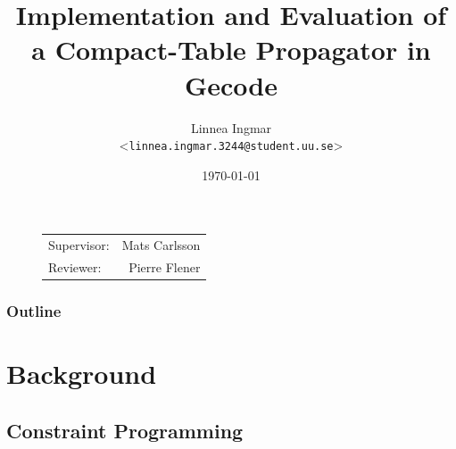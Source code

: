 \documentclass{beamer}
\title{Implementation and Evaluation of a Compact-Table Propagator in Gecode}
\author[Linnea Ingmar | \emph{linnea.ingmar.3244@student.uu.se}] %
{Linnea Ingmar \\ <\texttt{linnea.ingmar.3244@student.uu.se}>}
\institute[Dept. of Information Technology] %
{
  The ASTRA Group\\ on Combinatorial Optimisation \\
  Uppsala University
}
\date[\today] %
{\today}
\begin{document}
\begin{frame}[plain] %
  \titlepage
  
  \begin{figure}
    \begin{flushright}
        \begin{tabular}[t,right]{lr}
          Supervisor: & Mats Carlsson \\
          Reviewer:   & Pierre Flener
        \end{tabular}
      \end{flushright}
  \end{figure}

\end{frame}

\begin{frame}
    \frametitle{Outline}
    \tableofcontents[currentsection]
\end{frame}

\section{Background}

\subsection{Constraint Programming}
\end{document}
